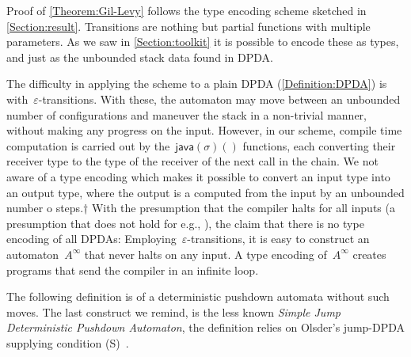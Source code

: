 Proof of \cref{Theorem:Gil-Levy} follows the type encoding scheme
  sketched in \cref{Section:result}.
Transitions are nothing but partial functions with multiple parameters.
As we saw in \cref{Section:toolkit}
  it is possible to encode these as types, and just as the unbounded
    stack data found in DPDA.

The difficulty in applying the scheme to a plain DPDA
  (\cref{Definition:DPDA}) is with~$ε$-transitions.
With these, the automaton may move between an unbounded number of
  configurations and maneuver the stack in a non-trivial manner,
  without making any progress on the input.
However, in our scheme, compile time computation is carried out
by the~$\textsf{java}(σ)()$ functions, each converting
  their receiver type to the type of the receiver of the next call in the chain.
We not aware of a \Java type encoding which makes
  it possible to convert an input type into an output type, where
  the output is a computed from the input by an unbounded number o steps.†{
    With the presumption that the \Java compiler halts for all inputs (a presumption that does
    not hold for e.g., \CC), the claim that there is no \Java type encoding of all DPDAs:
 Employing~$ε$-transitions, it is easy to construct an automaton~$A^∞$ that
  never halts on any input.
A type encoding of~$A^∞$ creates programs that send the compiler in an infinite loop.
}

The following definition is of a deterministic pushdown automata without such moves.
The last construct we remind, is the less known \emph{Simple Jump Deterministic Pushdown Automaton},
the definition relies on Olsder's jump-DPDA supplying condition (S)~\cite{Courcelle:77}.


